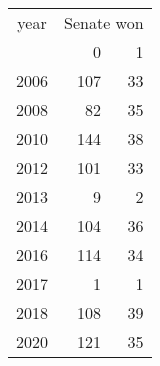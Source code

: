 \footnotesize\begin{tabular}[t]{lrr}
\toprule
\multicolumn{1}{c}{year} & \multicolumn{2}{c}{Senate won} \\
\cmidrule(l{3pt}r{3pt}){1-1} \cmidrule(l{3pt}r{3pt}){2-3}
  & 0 & 1\\
\midrule
2006 & 107 & 33\\
2008 & 82 & 35\\
2010 & 144 & 38\\
2012 & 101 & 33\\
2013 & 9 & 2\\
2014 & 104 & 36\\
2016 & 114 & 34\\
2017 & 1 & 1\\
2018 & 108 & 39\\
2020 & 121 & 35\\
\bottomrule
\end{tabular}
